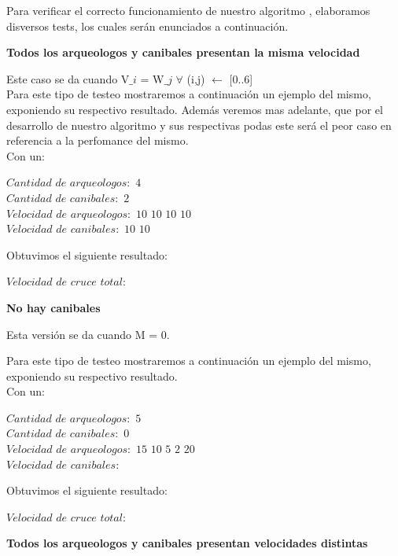 \indent Para verificar el correcto funcionamiento de nuestro algoritmo , elaboramos disversos tests,
los cuales ser\'an enunciados a continuaci\'on.\\

\begin{center}
 \textbf{Todos los arqueologos y canibales presentan la misma velocidad}
\end{center}

Este caso se da cuando V${\_i}$ = W${\_j}$ $\forall$ (i,j)  $\gets$ [0..6] \\

 Para este tipo de testeo mostraremos a continuaci\'on un ejemplo del mismo, exponiendo su respectivo resultado. Adem\'as veremos mas adelante, que por el desarrollo de nuestro algoritmo y sus respectivas podas este ser\'a el peor caso en referencia a la perfomance del mismo.\\
 
 Con un:
\begin{flushleft}
	$Cantidad$ $de$ $arqueologos:$ $4 $  \\
	$Cantidad$ $de$ $canibales:$ $2 $  \\
	$Velocidad$ $de$ $arqueologos:$ $10$ $10$ $10$ $10$  \\
	$Velocidad$ $de$ $canibales:$ $10$ $10 $  \\
 \end{flushleft}	
  Obtuvimos el siguiente resultado:
\begin{flushleft}  
  $Velocidad$ $de$ $cruce$ $total: $\\
 \end{flushleft}


 \begin{center}
 \textbf{No hay canibales}
\end{center}

Esta versi\'on se da cuando M = 0. 

Para este tipo de testeo mostraremos a continuaci\'on un ejemplo del mismo, exponiendo su respectivo resultado.\\

 Con un:
 \begin{flushleft}
  	$Cantidad$ $de$ $arqueologos:$ $5 $  \\
	$Cantidad$ $de$ $canibales:$ $0 $  \\
	$Velocidad$ $de$ $arqueologos:$ $15$ $10$ $5$ $2$ $20$  \\
	$Velocidad$ $de$ $canibales: $  \\
\end{flushleft}
  Obtuvimos el siguiente resultado:
  \begin{flushleft}
$Velocidad$ $de$ $cruce$ $total: $\\
\end{flushleft}
\begin{center}
 \textbf{Todos los arqueologos y canibales presentan velocidades distintas}
\end{center}

